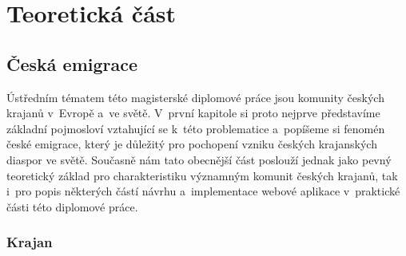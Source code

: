 \part{Teoretická část}

\hypertarget{ux10deskuxe1-emigrace}{%
\chapter{Česká emigrace}\label{ux10deskuxe1-emigrace}}

Ústředním tématem této magisterské diplomové práce jsou komunity českých krajanů v~Evropě a~ve světě. V~první kapitole si proto nejprve představíme základní pojmosloví vztahující se k~této problematice a~popíšeme si fenomén české emigrace, který je důležitý pro pochopení vzniku českých krajanských diaspor ve světě. Současně nám tato obecnější část poslouží jednak jako pevný teoretický základ pro charakteristiku významným komunit českých krajanů, tak i~pro popis některých částí návrhu a~implementace webové aplikace v~praktické části této diplomové práce.

\hypertarget{krajan}{%
\section{Krajan}\label{krajan}}

